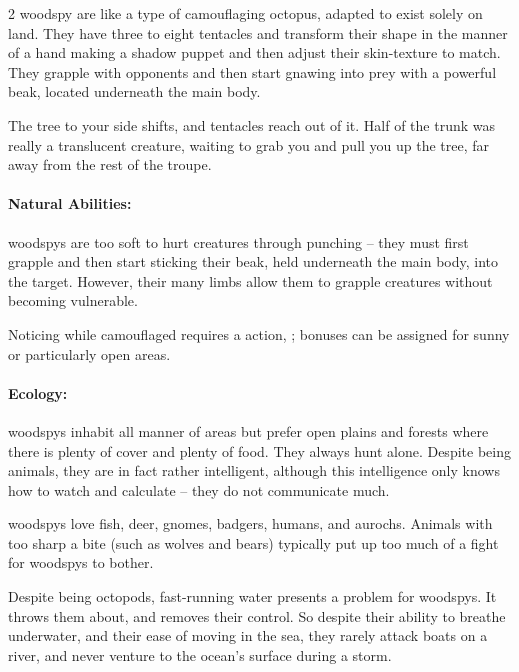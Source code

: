 \begin{multicols}{2}
  {woodspy}%
are like a type of camouflaging octopus, adapted to exist solely on land.
They have three to eight tentacles and transform their shape in the manner of a hand making a shadow puppet and then adjust their skin-texture to match.
They grapple with opponents and then start gnawing into prey with a powerful beak, located underneath the main body.

\begin{boxtext}
  The tree to your side shifts, and tentacles reach out of it.
  Half of the trunk was really a translucent creature, waiting to grab you and pull you up the tree, far away from the rest of the troupe.
\end{boxtext}

\paragraph{Natural Abilities:} \glspl{woodspy} are too soft to hurt creatures through punching -- they must first grapple and then start sticking their beak, held underneath the main body, into the target.
However, their many limbs allow them to grapple creatures without becoming vulnerable.%

Noticing  while camouflaged requires a  action, \tn[14]; bonuses can be assigned for sunny or particularly open areas.

\woodspy

\paragraph{Ecology:} \Glspl{woodspy} inhabit all manner of areas but prefer open plains and forests where there is plenty of cover and plenty of food.  They always hunt alone.  Despite being animals, they are in fact rather intelligent, although this intelligence only knows how to watch and calculate -- they do not communicate much.

\Glspl{woodspy} love fish, deer, gnomes, badgers, humans, and aurochs.
Animals with too sharp a bite (such as wolves and bears) typically put up too much of a fight for \glspl{woodspy} to bother.

Despite being octopods, fast-running water presents a problem for \glspl{woodspy}.
It throws them about, and removes their control.
So despite their ability to breathe underwater, and their ease of moving in the sea, they rarely attack boats on a river, and never venture to the ocean's surface during a storm.


\end{multicols}
